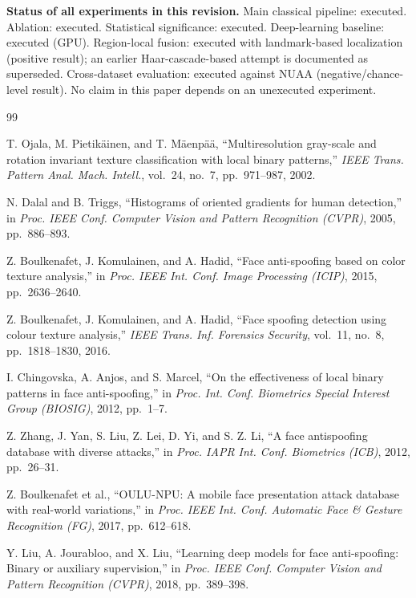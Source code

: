 \documentclass[11pt]{article}
\begin{document}
\textbf{Status of all experiments in this revision.} Main classical pipeline: executed. Ablation: executed. Statistical significance: executed. Deep-learning baseline: executed (GPU). Region-local fusion: executed with landmark-based localization (positive result); an earlier Haar-cascade-based attempt is documented as superseded. Cross-dataset evaluation: executed against NUAA (negative/chance-level result). No claim in this paper depends on an unexecuted experiment.

\begin{thebibliography}{99}

 T. Ojala, M. Pietik\"ainen, and T. M\"aenp\"a\"a, ``Multiresolution gray-scale and rotation invariant texture classification with local binary patterns,'' \emph{IEEE Trans. Pattern Anal. Mach. Intell.}, vol.\ 24, no.\ 7, pp.\ 971--987, 2002.

 N. Dalal and B. Triggs, ``Histograms of oriented gradients for human detection,'' in \emph{Proc. IEEE Conf. Computer Vision and Pattern Recognition (CVPR)}, 2005, pp.\ 886--893.

 Z. Boulkenafet, J. Komulainen, and A. Hadid, ``Face anti-spoofing based on color texture analysis,'' in \emph{Proc. IEEE Int. Conf. Image Processing (ICIP)}, 2015, pp.\ 2636--2640.

 Z. Boulkenafet, J. Komulainen, and A. Hadid, ``Face spoofing detection using colour texture analysis,'' \emph{IEEE Trans. Inf. Forensics Security}, vol.\ 11, no.\ 8, pp.\ 1818--1830, 2016.

 I. Chingovska, A. Anjos, and S. Marcel, ``On the effectiveness of local binary patterns in face anti-spoofing,'' in \emph{Proc. Int. Conf. Biometrics Special Interest Group (BIOSIG)}, 2012, pp.\ 1--7.

 Z. Zhang, J. Yan, S. Liu, Z. Lei, D. Yi, and S. Z. Li, ``A face antispoofing database with diverse attacks,'' in \emph{Proc. IAPR Int. Conf. Biometrics (ICB)}, 2012, pp.\ 26--31.

 Z. Boulkenafet et al., ``OULU-NPU: A mobile face presentation attack database with real-world variations,'' in \emph{Proc. IEEE Int. Conf. Automatic Face \& Gesture Recognition (FG)}, 2017, pp.\ 612--618.

 Y. Liu, A. Jourabloo, and X. Liu, ``Learning deep models for face anti-spoofing: Binary or auxiliary supervision,'' in \emph{Proc. IEEE Conf. Computer Vision and Pattern Recognition (CVPR)}, 2018, pp.\ 389--398.


\end{thebibliography}
\end{document}
